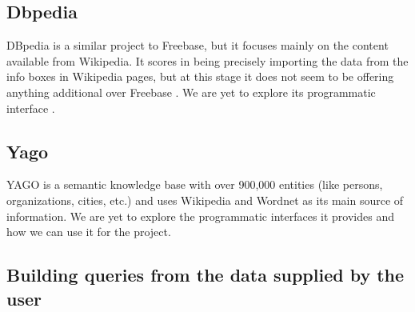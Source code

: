 \documentclass[11pt]{article}
\begin{document}
\subsection{Dbpedia}
DBpedia is a similar project to Freebase, but it focuses mainly on the content
available from Wikipedia. It scores in being precisely importing the data from
the info boxes in Wikipedia pages, but at this stage it does not seem to be
offering anything additional over Freebase \cite{freebasedbpedia}. We are yet to
explore its programmatic interface \cite{dbpediaapi}.


\subsection{Yago}
YAGO is a semantic knowledge base with over 900,000 entities (like persons,
organizations, cities, etc.) and uses Wikipedia and Wordnet as its main source of
information. We are yet to explore the programmatic interfaces it provides and
how we can use it for the project.



\subsection {Building queries from the data supplied by the user}
\end{document}
